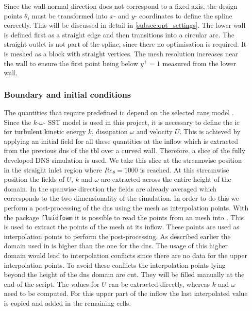 Since the wall-normal direction does not correspond to a fixed axis, the design points $\theta_i$ must be transformed into $x$- and $y$- coordinates to define the spline correctly.
This will be discussed in detail in \autoref{subsec:opt_settings}.
The lower wall is defined first as a straight edge and then transitions into a circular arc.
The straight outlet is not part of the spline, since there no optimisation is required.
It is meshed as a block with straight vertices.
The mesh resolution increases near the wall to ensure the first point being below $y^+ = 1$ measured from the lower wall.






\subsubsection{Boundary and initial conditions}
The quantities that require predefined \acrshort{ic} depend on the selected \acrshort{rans} model \citep{wilcox_turbulence_2006}. 
Since the $k\text{-}\omega\text{-}$ SST model is used in this project, it is necessary to define the \acrshort{ic} for turbulent kinetic energy $k$, dissipation $\omega$ and velocity $U$. 
This is achieved by applying an initial field for all these quantities at the inflow which is extracted from the previous \acrshort{dns} of the \acrshort{tbl} over a curved wall.
Therefore, a slice of the fully developed DNS simulation is used.
We take this slice at the streamwise position in the straight inlet region where $Re_{\theta} = 1000$ is reached.
At this streamwise position the fields of $U$, $k$ and $\omega$ are extracted across the entire height of the domain. 
In the spanwise direction the fields are already averaged which corresponds to the two-dimensionality of the  simulation.
In order to do this we perform a post-processing of the \acrshort{dns} using the  mesh as interpolation points.
With the  package \texttt{fluidfoam} it is possible to read the points from an  mesh into . 
This is used to extract the points of the  mesh at its inflow.
These points are used as interpolation points to perform the post-processing. 
As described earlier the domain used in  is higher than the one for the \acrshort{dns}.
The usage of this higher domain would lead to interpolation conflicts since there are no data for the upper interpolation points. 
To avoid these conflicts the interpolation points lying beyond the height of the \acrshort{dns} domain are cut.
They will be filled manually at the end of the script.
The values for $U$ can be extracted directly, whereas $k$ and $\omega$ need to be computed. 
For this upper part of the inflow the last interpolated value is copied and added in the remaining cells.

